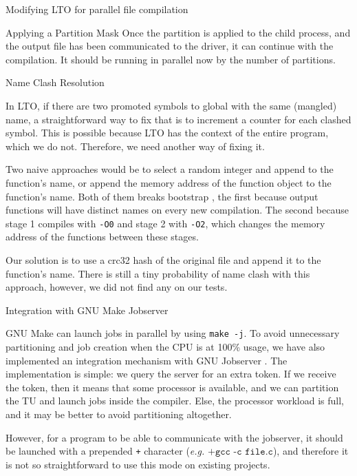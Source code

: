 \begin{section}{Modifying LTO for parallel file compilation}
\begin{subsection}{Applying a Partition Mask}
Once the partition is applied to the child process, and the output file has
been communicated to the driver, it can continue with the compilation. It
should be running in parallel now by the number of partitions.

\end{subsection}

\begin{subsection}{Name Clash Resolution}\label{sec:name_clash_resolution}

In LTO, if there are two promoted symbols to global with the same (mangled) name, a
straightforward way to fix that is to increment a counter for each clashed
symbol. This is possible because LTO has the context of the entire program,
which we do not. Therefore, we need another way of fixing it.

Two naive approaches would be to select a random integer and append to the
function's name, or append the memory address of the function object to the
function's name.  Both of them breaks bootstrap \cite{bootstrap}, the first
because output functions will have distinct names on every new compilation. The
second because stage 1 compiles with \texttt{-O0} and stage 2 with
\texttt{-O2}, which changes the memory address of the functions between these stages.

Our solution is to use a crc32 hash of the original file and append it to the
function's name.  There is still a tiny probability of name clash with this
approach, however, we did not find any on our tests.

\end{subsection}

\begin{subsection}{Integration with GNU Make Jobserver}\label{sec:integration_jobserver}

GNU Make can launch jobs in parallel by using \texttt{make -j}.  To
avoid unnecessary partitioning and job creation when the CPU is at 100\% usage,
we have also implemented an integration mechanism with GNU Jobserver
\cite{posixjobserver}.  The implementation is simple: we query the server for
an extra token. If we receive the token, then it means that some processor is
available, and we can partition the TU and launch jobs inside the compiler.
Else, the processor workload is full, and it may be better to avoid
partitioning altogether.

However, for a program to be able to communicate with the jobserver, it should
be launched with a prepended \texttt{+} character (\textit{e.g.} $\texttt{+gcc
-c file.c}$), and therefore it is not so straightforward to use this mode on
existing projects.


\end{subsection}
\end{section}
